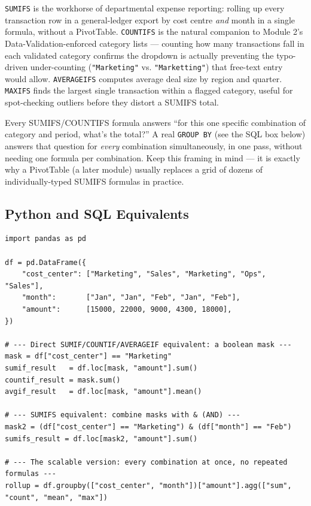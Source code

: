 \documentclass[11pt,a4paper]{article}
\begin{document}
\begin{financeapp}
\texttt{SUMIFS} is the workhorse of departmental expense reporting: rolling up every transaction row in a general-ledger export by cost centre \emph{and} month in a single formula, without a PivotTable. \texttt{COUNTIFS} is the natural companion to Module 2's Data-Validation-enforced category lists --- counting how many transactions fall in each validated category confirms the dropdown is actually preventing the typo-driven under-counting (\texttt{"Marketing"} vs. \texttt{"Marketting"}) that free-text entry would allow. \texttt{AVERAGEIFS} computes average deal size by region and quarter. \texttt{MAXIFS} finds the largest single transaction within a flagged category, useful for spot-checking outliers before they distort a SUMIFS total.
\end{financeapp}

\begin{protip}
Every SUMIFS/COUNTIFS formula answers ``for this one specific combination of category and period, what's the total?'' A real \texttt{GROUP BY} (see the SQL box below) answers that question for \emph{every} combination simultaneously, in one pass, without needing one formula per combination. Keep this framing in mind --- it is exactly why a PivotTable (a later module) usually replaces a grid of dozens of individually-typed SUMIFS formulas in practice.
\end{protip}

\subsection{Python and SQL Equivalents}

\begin{lstlisting}[style=pythonstyle, caption={Boolean-mask aggregation (the direct SUMIF/COUNTIF equivalent) and groupby (the SUMIFS-at-scale equivalent)}]
import pandas as pd

df = pd.DataFrame({
    "cost_center": ["Marketing", "Sales", "Marketing", "Ops", "Sales"],
    "month":       ["Jan", "Jan", "Feb", "Jan", "Feb"],
    "amount":      [15000, 22000, 9000, 4300, 18000],
})

# --- Direct SUMIF/COUNTIF/AVERAGEIF equivalent: a boolean mask ---
mask = df["cost_center"] == "Marketing"
sumif_result   = df.loc[mask, "amount"].sum()
countif_result = mask.sum()
avgif_result   = df.loc[mask, "amount"].mean()

# --- SUMIFS equivalent: combine masks with & (AND) ---
mask2 = (df["cost_center"] == "Marketing") & (df["month"] == "Feb")
sumifs_result = df.loc[mask2, "amount"].sum()

# --- The scalable version: every combination at once, no repeated formulas ---
rollup = df.groupby(["cost_center", "month"])["amount"].agg(["sum", "count", "mean", "max"])
\end{lstlisting}
\end{document}
